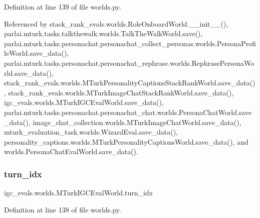 Definition at line 139 of file worlds.\+py.



Referenced by stack\+\_\+rank\+\_\+evals.\+worlds.\+Role\+Onboard\+World.\+\_\+\+\_\+init\+\_\+\+\_\+(), parlai.\+mturk.\+tasks.\+talkthewalk.\+worlds.\+Talk\+The\+Walk\+World.\+save(), parlai.\+mturk.\+tasks.\+personachat.\+personachat\+\_\+collect\+\_\+personas.\+worlds.\+Persona\+Profile\+World.\+save\+\_\+data(), parlai.\+mturk.\+tasks.\+personachat.\+personachat\+\_\+rephrase.\+worlds.\+Rephrase\+Persona\+World.\+save\+\_\+data(), stack\+\_\+rank\+\_\+evals.\+worlds.\+M\+Turk\+Personality\+Captions\+Stack\+Rank\+World.\+save\+\_\+data(), stack\+\_\+rank\+\_\+evals.\+worlds.\+M\+Turk\+Image\+Chat\+Stack\+Rank\+World.\+save\+\_\+data(), igc\+\_\+evals.\+worlds.\+M\+Turk\+I\+G\+C\+Eval\+World.\+save\+\_\+data(), parlai.\+mturk.\+tasks.\+personachat.\+personachat\+\_\+chat.\+worlds.\+Persona\+Chat\+World.\+save\+\_\+data(), image\+\_\+chat\+\_\+collection.\+worlds.\+M\+Turk\+Image\+Chat\+World.\+save\+\_\+data(), mturk\+\_\+evaluation\+\_\+task.\+worlds.\+Wizard\+Eval.\+save\+\_\+data(), personality\+\_\+captions.\+worlds.\+M\+Turk\+Personality\+Captions\+World.\+save\+\_\+data(), and worlds.\+Persona\+Chat\+Eval\+World.\+save\+\_\+data().

\mbox{\label{classigc__evals_1_1worlds_1_1MTurkIGCEvalWorld_a3bcc7bb6425e13848844cbb318503685}} 
\subsubsection{\texorpdfstring{turn\+\_\+idx}{turn\_idx}}
{\footnotesize\ttfamily igc\+\_\+evals.\+worlds.\+M\+Turk\+I\+G\+C\+Eval\+World.\+turn\+\_\+idx}



Definition at line 138 of file worlds.\+py.



